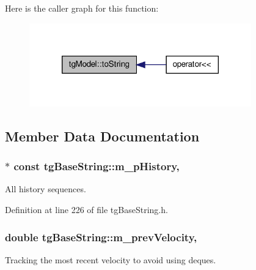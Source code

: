 Here is the caller graph for this function\-:\nopagebreak
\begin{figure}[H]
\begin{center}
\leavevmode
\includegraphics[width=272pt]{classtg_model_af37b0c1a6d4060bfe0bb9b5038a17725_icgraph}
\end{center}
\end{figure}




\subsection{Member Data Documentation}
\hypertarget{classtg_base_string_ab50177e75064ed5863e497cad34df60a}{
\subsubsection[{m\-\_\-p\-History}]{$\ast$ const tg\-Base\-String\-::m\-\_\-p\-History\hspace{0.3cm}{\ttfamily [protected]}, {\ttfamily [inherited]}}}\label{classtg_base_string_ab50177e75064ed5863e497cad34df60a}
All history sequences. 

Definition at line 226 of file tg\-Base\-String.\-h.

\hypertarget{classtg_base_string_af54d1188ce7eb296b3b1df2224286424}{
\subsubsection[{m\-\_\-prev\-Velocity}]{\setlength{\rightskip}{0pt plus 5cm}double tg\-Base\-String\-::m\-\_\-prev\-Velocity\hspace{0.3cm}{\ttfamily [protected]}, {\ttfamily [inherited]}}}\label{classtg_base_string_af54d1188ce7eb296b3b1df2224286424}
Tracking the most recent velocity to avoid using deques. 

